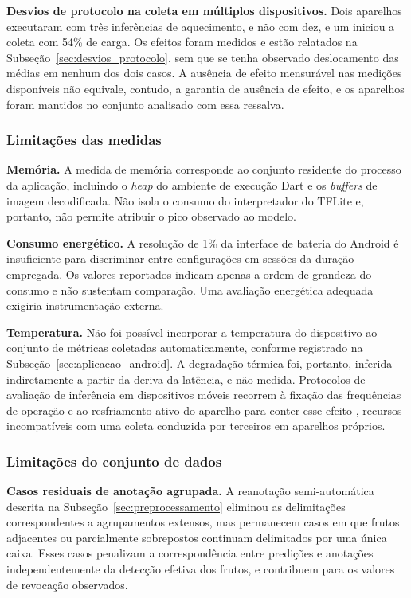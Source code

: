 \documentclass[artigo,times,capa]{iftex2024}
\begin{document}
\textbf{Desvios de protocolo na coleta em múltiplos dispositivos.} Dois aparelhos executaram com três inferências de aquecimento, e não com dez, e um iniciou a coleta com 54\% de carga. Os efeitos foram medidos e estão relatados na Subseção~\ref{sec:desvios_protocolo}, sem que se tenha observado deslocamento das médias em nenhum dos dois casos. A ausência de efeito mensurável nas medições disponíveis não equivale, contudo, a garantia de ausência de efeito, e os aparelhos foram mantidos no conjunto analisado com essa ressalva.

\subsubsection{Limitações das medidas}

\textbf{Memória.} A medida de memória corresponde ao conjunto residente do processo da aplicação, incluindo o \textit{heap} do ambiente de execução Dart e os \textit{buffers} de imagem decodificada. Não isola o consumo do interpretador do \ac{TFLite} e, portanto, não permite atribuir o pico observado ao modelo.

\textbf{Consumo energético.} A resolução de 1\% da interface de bateria do Android é insuficiente para discriminar entre configurações em sessões da duração empregada. Os valores reportados indicam apenas a ordem de grandeza do consumo e não sustentam comparação. Uma avaliação energética adequada exigiria instrumentação externa.

\textbf{Temperatura.} Não foi possível incorporar a temperatura do dispositivo ao conjunto de métricas coletadas automaticamente, conforme registrado na Subseção~\ref{sec:aplicacao_android}. A degradação térmica foi, portanto, inferida indiretamente a partir da deriva da latência, e não medida. Protocolos de avaliação de inferência em dispositivos móveis recorrem à fixação das frequências de operação e ao resfriamento ativo do aparelho para conter esse efeito \cite{Li2024Benchmark}, recursos incompatíveis com uma coleta conduzida por terceiros em aparelhos próprios.

\subsubsection{Limitações do conjunto de dados}

\textbf{Casos residuais de anotação agrupada.} A reanotação semi-automática descrita na Subseção~\ref{sec:preprocessamento} eliminou as delimitações correspondentes a agrupamentos extensos, mas permanecem casos em que frutos adjacentes ou parcialmente sobrepostos continuam delimitados por uma única caixa. Esses casos penalizam a correspondência entre predições e anotações independentemente da detecção efetiva dos frutos, e contribuem para os valores de revocação observados.
\end{document}
